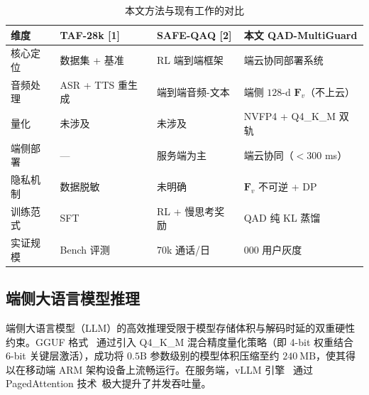 \documentclass[11pt, a4paper]{article}
\begin{document}
\begin{table}[htbp]
\centering
\small
\setlength{\abovecaptionskip}{4pt}
\setlength{\belowcaptionskip}{3pt}

\caption{本文方法与现有工作的对比}
\label{tab1}

\renewcommand{\arraystretch}{1.15}
\setlength{\tabcolsep}{6pt}

\begin{tabular}{>{\centering\arraybackslash}m{2.2cm}
                >{\raggedright\arraybackslash}m{3.5cm}
                >{\raggedright\arraybackslash}m{3.5cm}
                >{\raggedright\arraybackslash}m{5cm}}
\toprule

\textbf{维度} &
\textbf{TAF-28k [1]} &
\textbf{SAFE-QAQ [2]} &
\textbf{本文 QAD-MultiGuard} \\

\midrule

核心定位 
& 数据集 + 基准 
& RL 端到端框架 
& 端云协同部署系统 \\

音频处理 
& ASR + TTS 重生成 
& 端到端音频-文本 
& 端侧 $128$-d $\mathbf{F}_v$（不上云） \\

量化 
& 未涉及 
& 未涉及 
& NVFP4 + Q4\_K\_M 双轨 \\

端侧部署 
& --- 
& 服务端为主 
& 端云协同（$<300$ ms） \\

隐私机制 
& 数据脱敏 
& 未明确 
& $\mathbf{F}_v$ 不可逆 + DP \\

训练范式 
& SFT 
& RL + 慢思考奖励 
& QAD 纯 KL 蒸馏 \\

实证规模 
& Bench 评测 
& 70k 通话/日 
& 5{,}000 用户灰度 \\

\bottomrule
\end{tabular}

\end{table}

\subsection{端侧大语言模型推理}
端侧大语言模型（LLM）的高效推理受限于模型存储体积与解码时延的双重硬性约束。GGUF 格式~\cite{17} 通过引入 Q4\_K\_M 混合精度量化策略（即 4-bit 权重结合 6-bit 关键层激活），成功将 $0.5\text{B}$ 参数级别的模型体积压缩至约 $240~\text{MB}$，使其得以在移动端 ARM 架构设备上流畅运行。在服务端，vLLM 引擎~\cite{18} 通过 PagedAttention 技术~\cite{19}极大提升了并发吞吐量。
\end{document}
